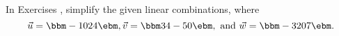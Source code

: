 {\noin In Exercises }
{, simplify the given linear combinations, where
\[
\vec u = \bbm -1\\0\\2\\4\ebm, \vec v = \bbm 3\\4\\-5\\0\ebm, \text{ and } \vec w = \bbm -3\\2\\0\\7\ebm.
\]}
